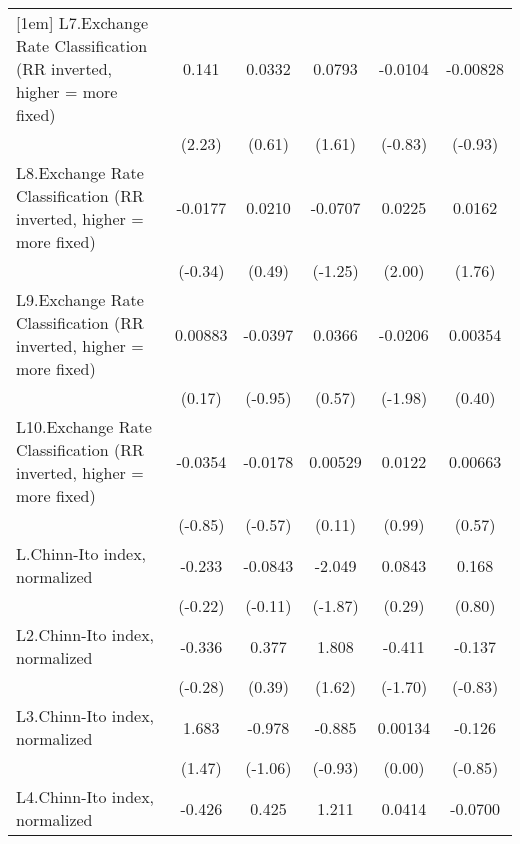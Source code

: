 {\begin{tabular}{l*{5}{c}}
[1em]
L7.Exchange Rate Classification (RR inverted, higher = more fixed)&    0.141\sym{*}  &   0.0332         &   0.0793         &  -0.0104         & -0.00828         \\
                &   (2.23)         &   (0.61)         &   (1.61)         &  (-0.83)         &  (-0.93)         \\
[1em]
L8.Exchange Rate Classification (RR inverted, higher = more fixed)&  -0.0177         &   0.0210         &  -0.0707         &   0.0225\sym{*}  &   0.0162         \\
                &  (-0.34)         &   (0.49)         &  (-1.25)         &   (2.00)         &   (1.76)         \\
[1em]
L9.Exchange Rate Classification (RR inverted, higher = more fixed)&  0.00883         &  -0.0397         &   0.0366         &  -0.0206\sym{*}  &  0.00354         \\
                &   (0.17)         &  (-0.95)         &   (0.57)         &  (-1.98)         &   (0.40)         \\
[1em]
L10.Exchange Rate Classification (RR inverted, higher = more fixed)&  -0.0354         &  -0.0178         &  0.00529         &   0.0122         &  0.00663         \\
                &  (-0.85)         &  (-0.57)         &   (0.11)         &   (0.99)         &   (0.57)         \\
[1em]
L.Chinn-Ito index, normalized&   -0.233         &  -0.0843         &   -2.049         &   0.0843         &    0.168         \\
                &  (-0.22)         &  (-0.11)         &  (-1.87)         &   (0.29)         &   (0.80)         \\
[1em]
L2.Chinn-Ito index, normalized&   -0.336         &    0.377         &    1.808         &   -0.411         &   -0.137         \\
                &  (-0.28)         &   (0.39)         &   (1.62)         &  (-1.70)         &  (-0.83)         \\
[1em]
L3.Chinn-Ito index, normalized&    1.683         &   -0.978         &   -0.885         &  0.00134         &   -0.126         \\
                &   (1.47)         &  (-1.06)         &  (-0.93)         &   (0.00)         &  (-0.85)         \\
[1em]
L4.Chinn-Ito index, normalized&   -0.426         &    0.425         &    1.211         &   0.0414         &  -0.0700         \\

\end{tabular}}
